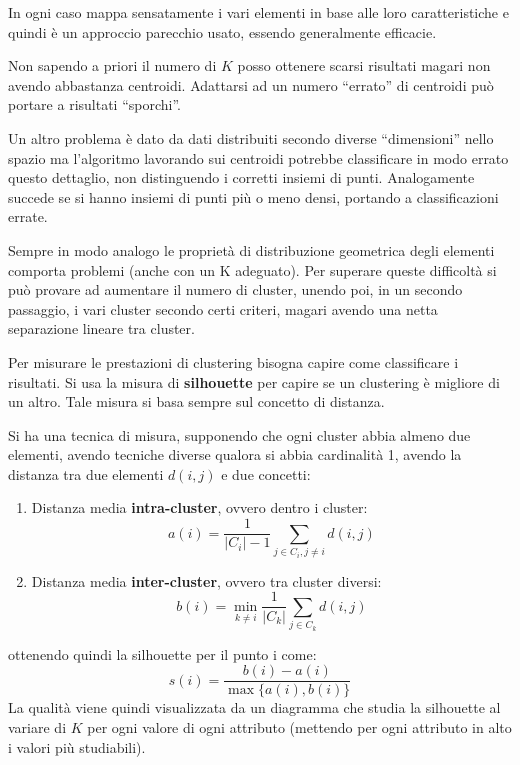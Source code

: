 In ogni caso mappa sensatamente i vari elementi in base alle loro caratteristiche
e quindi è un approccio parecchio usato, essendo generalmente efficacie.

Non sapendo a priori il numero di $K$ posso ottenere scarsi risultati magari non
avendo abbastanza centroidi. Adattarsi ad un numero “errato” di centroidi può
portare a risultati “sporchi”.

Un altro problema è dato da dati distribuiti secondo diverse “dimensioni” nello
spazio ma l'algoritmo lavorando sui centroidi potrebbe classificare in modo errato
questo dettaglio, non distinguendo i corretti insiemi di punti. Analogamente
succede se si hanno insiemi di punti più o meno densi, portando a classificazioni errate.

Sempre in modo analogo le proprietà di distribuzione geometrica degli elementi
comporta problemi (anche con un K adeguato). Per superare queste difficoltà si
può provare ad aumentare il numero di cluster, unendo poi, in un secondo passaggio,
i vari cluster secondo certi criteri, magari avendo una netta separazione lineare tra cluster.

Per misurare le prestazioni di clustering bisogna capire come classificare i
risultati. Si usa la misura di \textbf{silhouette} per capire se un clustering è
migliore di un altro. Tale misura si basa sempre sul concetto di distanza.

Si ha una tecnica di misura, supponendo che ogni cluster abbia almeno due elementi,
avendo tecniche diverse qualora si abbia cardinalità 1, avendo la distanza tra
due elementi $d(i, j)$ e due concetti:
\begin{enumerate}
    \item Distanza media \textbf{intra-cluster}, ovvero dentro i cluster:
          \begin{equation}
              a(i) = \frac{1}{|C_i| - 1} \sum_{j \in C_i, j \neq i} d(i, j)
          \end{equation}
    \item Distanza media \textbf{inter-cluster}, ovvero tra cluster diversi:
          \begin{equation}
              b(i) = \min_{k \neq i} \frac{1}{|C_k|} \sum_{j \in C_k} d(i, j)
          \end{equation}
\end{enumerate}
ottenendo quindi la silhouette per il punto i come:
\begin{equation}
    s(i) = \frac{b(i) - a(i)}{\max\{a(i), b(i)\}}
\end{equation}
La qualità viene quindi visualizzata da un diagramma che studia la silhouette al
variare di $K$ per ogni valore di ogni attributo (mettendo per ogni attributo in
alto i valori più studiabili).

